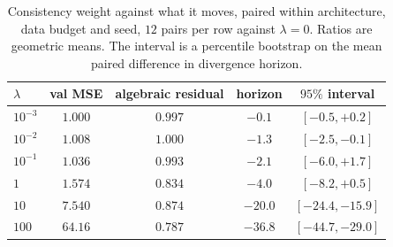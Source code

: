 \documentclass{article}
\begin{document}
\begin{table}[t]
\caption{Consistency weight against what it moves, paired within architecture,
data budget and seed, $12$ pairs per row against $\lambda = 0$. Ratios are
geometric means. The interval is a percentile bootstrap on the mean paired
difference in divergence horizon.}
\label{tab:lambda}
\begin{center}
\small
\begin{tabular}{lcccc}
$\lambda$ & val MSE & algebraic residual & horizon & $95\%$ interval \\
\hline
$10^{-3}$ & $1.000$ & $0.997$ & $-0.1$ & $[-0.5, +0.2]$ \\
$10^{-2}$ & $1.008$ & $1.000$ & $-1.3$ & $[-2.5, -0.1]$ \\
$10^{-1}$ & $1.036$ & $0.993$ & $-2.1$ & $[-6.0, +1.7]$ \\
$1$       & $1.574$ & $0.834$ & $-4.0$ & $[-8.2, +0.5]$ \\
$10$      & $7.540$ & $0.874$ & $-20.0$ & $[-24.4, -15.9]$ \\
$100$     & $64.16$ & $0.787$ & $-36.8$ & $[-44.7, -29.0]$ \\
\end{tabular}
\end{center}
\end{table}
\end{document}
